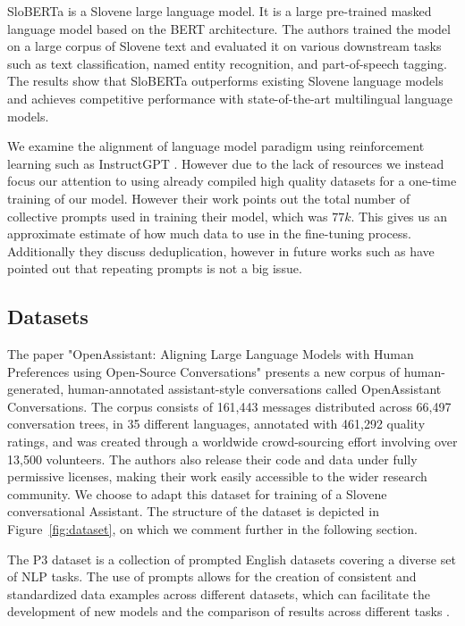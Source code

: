\documentclass[fleqn,moreauthors,10pt]{ds_report}
\begin{document}
SloBERTa \cite{ulvcar2021sloberta} is a Slovene large language model. It is a large pre-trained masked language model based on the BERT architecture. The authors trained the model on a large corpus of Slovene text and evaluated it on various downstream tasks such as text classification, named entity recognition, and part-of-speech tagging. The results show that SloBERTa outperforms existing Slovene language models and achieves competitive performance with state-of-the-art multilingual language models. 

We examine the alignment of language model paradigm using reinforcement learning such as InstructGPT \cite{ouyang2022training}. However due to the lack of resources we instead focus our attention to using already compiled high quality datasets for a one-time training of our model. However their work points out the total number of collective prompts used in training their model, which was $77k$. This gives us an approximate estimate of how much data to use in the fine-tuning process. Additionally they discuss deduplication, however in future works such as \cite{alpaca} have pointed out that repeating prompts is not a big issue.


\subsection*{Datasets}
The paper "OpenAssistant: Aligning Large Language Models with Human Preferences using Open-Source Conversations" \cite{köpf2023openassistant} presents a new corpus of human-generated, human-annotated assistant-style conversations called OpenAssistant Conversations. The corpus consists of 161,443 messages distributed across 66,497 conversation trees, in 35 different languages, annotated with 461,292 quality ratings, and was created through a worldwide crowd-sourcing effort involving over 13,500 volunteers. The authors also release their code and data under fully permissive licenses, making their work easily accessible to the wider research community. We choose to adapt this dataset for training of a Slovene conversational Assistant. The structure of the dataset is depicted in Figure~\ref{fig:dataset}, on which we comment further in the following section.

The P3 dataset is a collection of prompted English datasets covering a diverse set of NLP tasks. The use of prompts allows for the creation of consistent and standardized data examples across different datasets, which can facilitate the development of new models and the comparison of results across different tasks \cite{bach2022promptsource}. 
\end{document}
